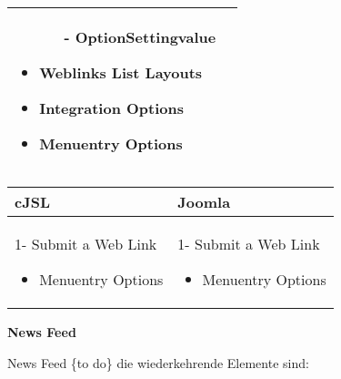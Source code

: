 \begin{minipage}{0.7\textwidth}
\begin{tabular}{|p{} | p{}|}
\begin{itemize}
\begin{enumerate}
   		    			 \item[-] OptionSettingvalue
   		    	\end{enumerate}
   	\item Weblinks List Layouts
   	\item Integration Options
	\item Menuentry Options
 \end{itemize}
\\
\hline
\end{tabular}
\end{minipage}

\begin{minipage}{0.7\textwidth}
\begin{tabular}{|p{} | p{}|}
\hline
\textbf{cJSL} & \textbf{Joomla} \\ 
\hline
 1- Submit a Web Link
 \begin{itemize}
 	\item Menuentry Options
  \end{itemize}
 & 
1- Submit a Web Link
 \begin{itemize}
	\item Menuentry Options
 \end{itemize}
\\
\hline
\end{tabular}
\end{minipage}

\textbf{News Feed}

News Feed \{to do\} die wiederkehrende Elemente sind:


